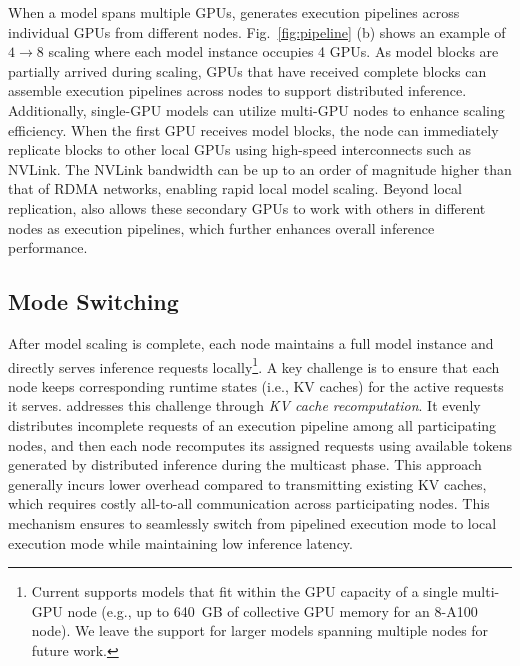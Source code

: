 When a model spans multiple GPUs, \AlgoName generates execution pipelines across individual GPUs from different nodes. 
Fig.~\ref{fig:pipeline} (b) shows an example of $4 \rightarrow 8$ scaling where each model instance occupies 4 GPUs. 
As model blocks are partially arrived during scaling, GPUs that have received complete blocks can assemble execution pipelines across nodes to support distributed inference.
Additionally, single-GPU models can utilize multi-GPU nodes to enhance scaling efficiency. 
When the first GPU receives model blocks, the node can immediately replicate blocks to other local GPUs using high-speed interconnects such as NVLink. 
The NVLink bandwidth can be up to an order of magnitude higher than that of RDMA networks, enabling rapid local model scaling. 
Beyond local replication, \AlgoName also allows these secondary GPUs to work with others in different nodes as execution pipelines, which further enhances overall inference performance. 
\fi 

\subsection{Mode Switching}

After model scaling is complete, each node maintains a full model instance and directly serves inference requests locally\footnote{Current \SysName supports models that fit within the GPU capacity of a single multi-GPU node (e.g., up to 640~GB of collective GPU memory for an 8-A100 node). We leave the support for larger models spanning multiple nodes for future work.}. 
A key challenge is to ensure that each node keeps corresponding runtime states (i.e., KV caches) for the active requests it serves.
\AlgoName addresses this challenge through \emph{KV cache recomputation}. 
It evenly distributes incomplete requests of an execution pipeline among all participating nodes, and then each node recomputes its assigned requests using available tokens generated by distributed inference during the multicast phase. 
This approach generally incurs lower overhead compared to transmitting existing KV caches, which requires costly all-to-all communication across participating nodes.
This mechanism ensures \AlgoName to seamlessly switch from pipelined execution mode to local execution mode while maintaining low inference latency.  

